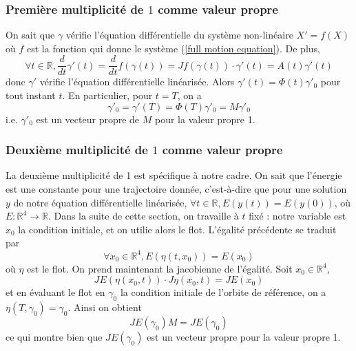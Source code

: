 \documentclass[12pt]{article}
\theoremstyle{definition}
\theoremstyle{definition}
\begin{document}
	\subsubsection{Première multiplicité de $1$ comme valeur propre}
	On sait que $\gamma$ vérifie l'équation différentielle du système non-linéaire $X' = f(X)$ où $f$ est la fonction qui donne le système (\ref{full motion equation}). De plus,
	\begin{equation}
		\forall t \in \mathbb{R}, \frac{d}{dt}\gamma'(t) = \frac{d}{dt}f(\gamma(t)) = Jf(\gamma(t)) \cdot \gamma'(t) = A(t)\gamma'(t)
	\end{equation}
	donc $\gamma'$ vérifie l'équation différentielle linéarisée. Alors $\gamma'(t) = \Phi(t)\gamma'_0$ pour tout instant $t$. En particulier, pour $t=T$, on a
	\begin{equation}
		\gamma'_0 = \gamma'(T) = \Phi(T)\gamma'_0 = M\gamma'_0
	\end{equation}
	i.e. $\gamma'_0$ est un vecteur propre de $M$ pour la valeur propre 1.
	
	\subsubsection{Deuxième multiplicité de $1$ comme valeur propre}
	La deuxième multiplicité de 1 est spécifique à notre cadre. On sait que l'énergie est une constante pour une trajectoire donnée, c'est-à-dire que pour une solution $y$ de notre équation différentielle linéarisée, $\forall t \in \mathbb{R}, E(y(t)) = E(y(0))$, où $E : \mathbb{R}^4 \to \mathbb{R}$. Dans la suite de cette section, on travaille à $t$ fixé : notre variable est $x_0$ la condition initiale, et on utilie alors le flot. L'égalité précédente se traduit par
	\begin{equation}
		\forall x_0 \in \mathbb{R}^4, E(\eta(t,x_0)) = E(x_0)
	\end{equation}
	où $\eta$ est le flot. On prend maintenant la jacobienne de l'égalité. Soit $x_0 \in \mathbb{R}^4$,
	\begin{equation}
		JE(\eta(x_0,t)) \cdot J\eta(x_0,t) = JE(x_0)
	\end{equation}
	et en évaluant le flot en $\gamma_0$ la condition initiale de l'orbite de référence, on a $\eta(T,\gamma_0) = \gamma_0$. Ainsi on obtient
	\begin{equation}
		JE(\gamma_0)M = JE(\gamma_0)
	\end{equation}
	ce qui montre bien que $JE(\gamma_0)$ est un vecteur propre pour la valeur propre 1.
	
\end{document}
